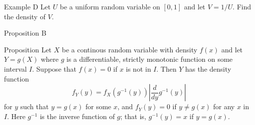 \documentclass{beamer}
\begin{document}
\begin{frame}{Example D}
Let \(U\) be a uniform random variable on \([0,1]\) and let \(V=1/U\). Find the density of \(V\). 
\end{frame}


\begin{frame}{Proposition B}
    \begin{block}{Proposition}
        Let \(X\) be a continous random variable with density \(f(x)\) and let \(Y=g(X)\) where \(g\) is a differentiable, strictly monotonic function on some interval \(I\). Suppose that \(f(x)=0\) if \(x\) is not in \(I\). Then \(Y\) has the density function \[
        f_Y(y) = f_X(g^{-1}(y))\left|\dfrac{d}{dy}g^{-1}(y)\right|
        \] for \(y\) such that \(y=g(x)\) for some \(x\), and \(f_Y(y)=0\) if \(y \ne g(x)\) for any \(x\) in \(I\). Here \(g^{-1}\) is the inverse function of \(g\); that is, \(g^{-1}(y)=x\) if \(y=g(x)\). 
    \end{block}
    
\end{frame}
\end{document}
